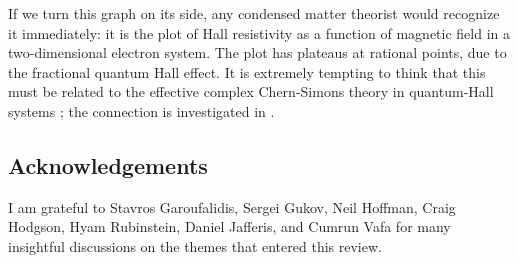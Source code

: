 \documentclass[12pt]{article}
\begin{document}
If we turn this graph on its side, any condensed matter theorist would recognize it immediately: it is the plot of Hall resistivity as a function of magnetic field in a two-dimensional electron system. The plot has plateaus at rational points, due to the fractional quantum Hall effect. It is extremely tempting to think that this must be related to the effective complex Chern-Simons theory in quantum-Hall systems \cite{DIVafa-FQHE}; the connection is investigated in \cite{DIDGV-FQHE}.









\subsection*{Acknowledgements}

I am grateful to Stavros Garoufalidis, Sergei Gukov, Neil Hoffman, Craig Hodgson, Hyam Rubinstein, Daniel Jafferis, and Cumrun Vafa for many insightful discussions on the themes that entered this review.

\documentfinish
\end{document}
